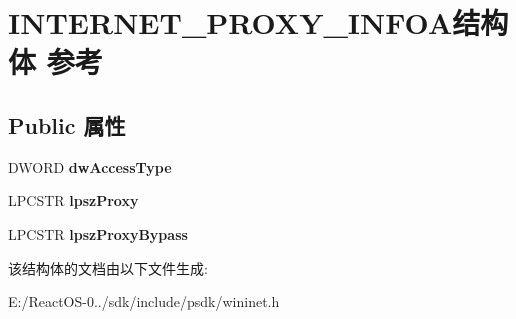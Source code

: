 \hypertarget{struct_i_n_t_e_r_n_e_t___p_r_o_x_y___i_n_f_o_a}{}\section{I\+N\+T\+E\+R\+N\+E\+T\+\_\+\+P\+R\+O\+X\+Y\+\_\+\+I\+N\+F\+O\+A结构体 参考}
\label{struct_i_n_t_e_r_n_e_t___p_r_o_x_y___i_n_f_o_a}
\subsection*{Public 属性}
\begin{DoxyCompactItemize}
\item 
\mbox{\label{struct_i_n_t_e_r_n_e_t___p_r_o_x_y___i_n_f_o_a_aa5f529975567bf73d54b48799dfbdcc8}} 
D\+W\+O\+RD {\bfseries dw\+Access\+Type}
\item 
\mbox{\label{struct_i_n_t_e_r_n_e_t___p_r_o_x_y___i_n_f_o_a_adb2611f57172d0ada6f6917730f2bcb6}} 
L\+P\+C\+S\+TR {\bfseries lpsz\+Proxy}
\item 
\mbox{\label{struct_i_n_t_e_r_n_e_t___p_r_o_x_y___i_n_f_o_a_a6f9d66e3047c2ae28821464c03733e41}} 
L\+P\+C\+S\+TR {\bfseries lpsz\+Proxy\+Bypass}
\end{DoxyCompactItemize}


该结构体的文档由以下文件生成\+:\begin{DoxyCompactItemize}
\item 
E\+:/\+React\+O\+S-\/0../sdk/include/psdk/wininet.\+h\end{DoxyCompactItemize}
